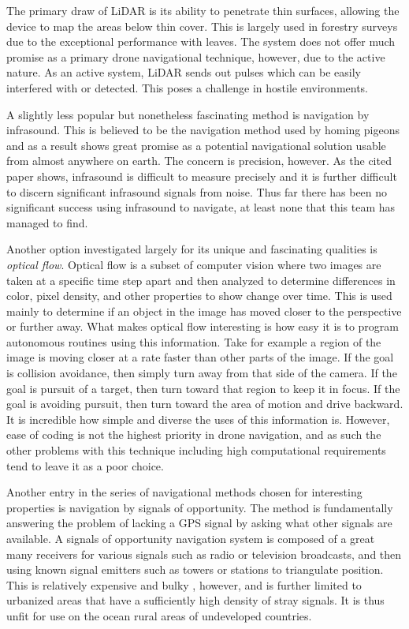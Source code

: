 \documentclass[]{article}
\begin{document}
    The primary draw of LiDAR is its ability to penetrate thin surfaces, allowing the device to map the areas below thin cover. This is largely used in forestry surveys \cite{tag3} due to the exceptional performance with leaves. The system does not offer much promise as a primary drone navigational technique, however, due to the active nature. As an active system, LiDAR sends out pulses which can be easily interfered with or detected. This poses a challenge in hostile environments.\newline
    
    A slightly less popular but nonetheless fascinating method is navigation by infrasound. This is believed to be the navigation method used by homing pigeons \cite{tag4} and as a result shows great promise as a potential navigational solution usable from almost anywhere on earth. The concern is precision, however. As the cited paper shows, infrasound is difficult to measure precisely and it is further difficult to discern significant infrasound signals from noise. Thus far there has been no significant success using infrasound to navigate, at least none that this team has managed to find.\newline
    
    Another option investigated largely for its unique and fascinating qualities is \emph{optical flow}. Optical flow is a subset of computer vision where two images are taken at a specific time step apart and then analyzed to determine differences in color, pixel density, and other properties to show change over time. This is used mainly to determine if an object in the image has moved closer to the perspective or further away. What makes optical flow interesting is how easy it is to program autonomous routines using this information. Take for example a region of the image is moving closer at a rate faster than other parts of the image. If the goal is collision avoidance, then simply turn away from that side of the camera. If the goal is pursuit of a target, then turn toward that region to keep it in focus. If the goal is avoiding pursuit, then turn toward the area of motion and drive backward\cite{tag5}. It is incredible how simple and diverse the uses of this information is. However, ease of coding is not the highest priority in drone navigation, and as such the other problems with this technique including high computational requirements tend to leave it as a poor choice.\newline
    
    Another entry in the series of navigational methods chosen for interesting properties is navigation by signals of opportunity. The method is fundamentally answering the problem of lacking a GPS signal by asking what other signals are available. A signals of opportunity navigation system is composed of a great many receivers for various signals such as radio or television broadcasts, and then using known signal emitters such as towers or stations to triangulate position. This is relatively expensive and bulky \cite{tag6}, however, and is further limited to urbanized areas that have a sufficiently high density of stray signals. It is thus unfit for use on the ocean rural areas of undeveloped countries.\newline
    
\end{document}
